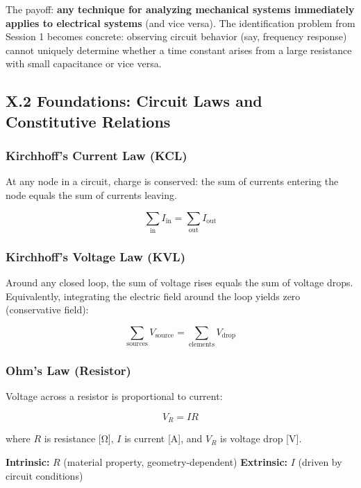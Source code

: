 \documentclass[
]{article}
\begin{document}
The payoff: \textbf{any technique for analyzing mechanical systems
immediately applies to electrical systems} (and vice versa). The
identification problem from Session 1 becomes concrete: observing
circuit behavior (say, frequency response) cannot uniquely determine
whether a time constant arises from a large resistance with small
capacitance or vice versa.

\subsection{X.2 Foundations: Circuit Laws and Constitutive
Relations}\label{x.2-foundations-circuit-laws-and-constitutive-relations}

\subsubsection{Kirchhoff's Current Law
(KCL)}\label{kirchhoffs-current-law-kcl}

At any node in a circuit, charge is conserved: the sum of currents
entering the node equals the sum of currents leaving.

\[\sum_{\text{in}} I_{\text{in}} = \sum_{\text{out}} I_{\text{out}}\]

\subsubsection{Kirchhoff's Voltage Law
(KVL)}\label{kirchhoffs-voltage-law-kvl}

Around any closed loop, the sum of voltage rises equals the sum of
voltage drops. Equivalently, integrating the electric field around the
loop yields zero (conservative field):

\[\sum_{\text{sources}} V_{\text{source}} = \sum_{\text{elements}} V_{\text{drop}}\]

\subsubsection{Ohm's Law (Resistor)}\label{ohms-law-resistor}

Voltage across a resistor is proportional to current:

\[V_R = IR\]

where \(R\) is resistance {[}Ω{]}, \(I\) is current {[}A{]}, and \(V_R\)
is voltage drop {[}V{]}.

\textbf{Intrinsic:} \(R\) (material property, geometry-dependent)
\textbf{Extrinsic:} \(I\) (driven by circuit conditions)
\end{document}
